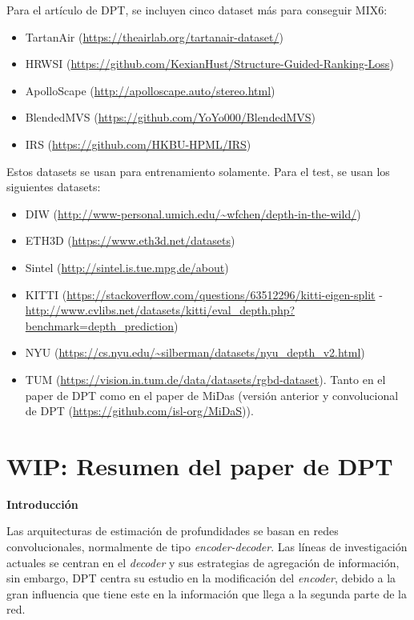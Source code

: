 \documentclass[a4paper]{article}
\begin{document}
Para el artículo de DPT, se incluyen cinco dataset más para conseguir MIX6:
\begin{itemize}
\item TartanAir (\url{https://theairlab.org/tartanair-dataset/})
\item HRWSI (\url{https://github.com/KexianHust/Structure-Guided-Ranking-Loss})
\item ApolloScape (\url{http://apolloscape.auto/stereo.html})
\item BlendedMVS (\url{https://github.com/YoYo000/BlendedMVS})
\item IRS (\url{https://github.com/HKBU-HPML/IRS})
\end{itemize}

Estos datasets se usan para entrenamiento solamente. Para el test, se usan los siguientes datasets: 

\begin{itemize}
\item DIW (\url{http://www-personal.umich.edu/~wfchen/depth-in-the-wild/})
\item ETH3D (\url{https://www.eth3d.net/datasets})
\item Sintel (\url{http://sintel.is.tue.mpg.de/about})
\item KITTI (\url{https://stackoverflow.com/questions/63512296/kitti-eigen-split} - \url{http://www.cvlibs.net/datasets/kitti/eval_depth.php?benchmark=depth_prediction})
\item NYU (\url{https://cs.nyu.edu/~silberman/datasets/nyu_depth_v2.html})
\item TUM (\url{https://vision.in.tum.de/data/datasets/rgbd-dataset}). 
Tanto en el paper de DPT como en el paper de MiDas (versión anterior y convolucional de DPT (\url{https://github.com/isl-org/MiDaS})).
\end{itemize}





\section{WIP: Resumen del paper de DPT}

\textbf{Introducción}

Las arquitecturas de estimación de profundidades se basan en redes convolucionales, normalmente de tipo \textit{encoder-decoder}. Las líneas de investigación actuales se centran en el \textit{decoder} y sus estrategias de agregación de información, sin embargo, DPT centra su estudio en la modificación del \textit{encoder}, debido a la gran influencia que tiene este en la información que llega a la segunda parte de la red.
\end{document}
